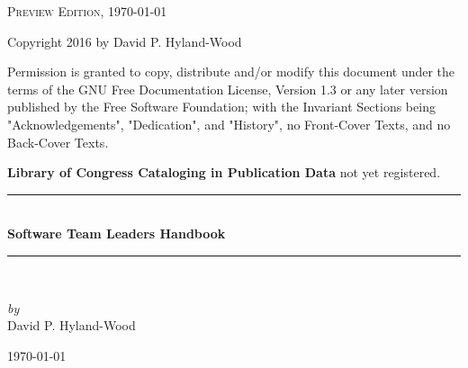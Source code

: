 \documentclass[12pt]{book} %
\newcommand{\HRule}{\rule{\linewidth}{0.5mm}}
\begin{document}
\begin{titlepage}
\vspace*{\fill}
\noindent
\textsc{Preview Edition, \today}

\vspace{5 mm}
\noindent
Copyright \textcopyright { }2016 by David P. Hyland-Wood

\vspace{5 mm}
\noindent
Permission is granted to copy, distribute and/or modify this document
under the terms of the GNU Free Documentation License, Version 1.3
or any later version published by the Free Software Foundation;
with the Invariant Sections being  "Acknowledgements", "Dedication",
and "History", no Front-Cover Texts, and no Back-Cover Texts.

\vspace{5 mm}
\noindent
\textbf{Library of Congress Cataloging in Publication Data} not yet registered.

\end{titlepage}

\pagestyle{empty}


\begin{titlepage}
\begin{center}


\HRule \\[0.4cm]
{ \Huge \bfseries Software Team Leaders Handbook \\[0.4cm] }
\HRule \\[1.5cm]

\noindent
\begin{minipage}{0.4\textwidth}
\begin{center} \large
\emph{by}\\
David P. Hyland-Wood
\end{center}
\end{minipage}%

\vfill

{\large \today}

\end{center}
\end{titlepage}
\end{document}
